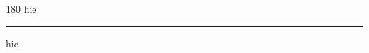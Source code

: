 
\begin{frame}
\begin{center}
\begin{turn}{180}
{\fontsize{2.5cm}{1em}\selectfont hie}
\end{turn}
\vspace{1em}\par  
\hrule
\vspace{1em}\par  
{\fontsize{2.5cm}{1em}\selectfont hie}
\end{center}
\end{frame}
